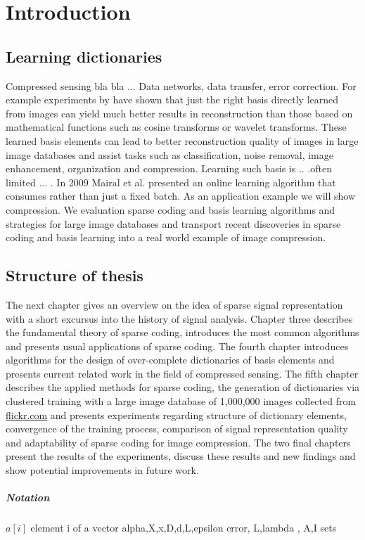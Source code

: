 \chapter{Introduction}
\label{sec:introduction}
\section{Learning dictionaries}
Compressed sensing bla bla ...
Data networks, data transfer, error correction. For example experiments by
\cite{} have shown that just the right basis directly learned from images can
yield much better results in reconstruction than those based on mathematical
functions such as cosine transforms or wavelet\cite{Elad2006,Mairal2010}
transforms. These learned basis elements can lead to better reconstruction
quality of images in large image databases and assist tasks such as
classification, noise removal, image enhancement, organization and compression. 
Learning such basis is .. .often limited ... . In 2009 Mairal et
al.\cite{Mairal2009} presented an online learning algorithm that consumes 
rather than just a fixed batch. As an application example we will show
compression. We evaluation sparse coding and basis learning algorithms and
strategies for large image databases and transport recent discoveries in sparse
coding and basis learning into a real world example of image compression.

\section{Structure of thesis}
The next chapter gives an overview on the idea of sparse signal
representation with a short excursus into the history of signal analysis.
Chapter three describes the fundamental theory of sparse coding, introduces the
most common algorithms and presents usual applications of sparse coding. The
fourth chapter introduces algorithms for the design of over-complete
dictionaries of basis elements and presents current related work in the field of
compressed sensing. The fifth chapter describes the applied methods for sparse
coding, the generation of dictionaries via clustered training with a large image
database of 1,000,000 images collected from \url{flickr.com} and presents
experiments regarding structure of dictionary elements, convergence of the
training process, comparison of signal representation quality and adaptability
of sparse coding for image compression. The two final chapters present the
results of the experiments, discuss these results and new findings and show
potential improvements in future work. 

\paragraph{Notation}
$a[i]$ element i of a vector
alpha,X,x,D,d,L,epsilon error, L,lambda , A,I sets


